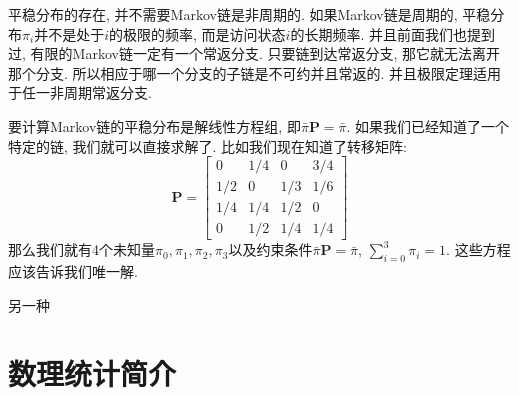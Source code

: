 \begin{remark}
    平稳分布的存在, 并不需要Markov链是非周期的. 如果Markov链是周期的, 平稳分布$\pi_i$并不是处于$i$的极限的频率, 而是访问状态$i$的长期频率. 并且前面我们也提到过, 有限的Markov链一定有一个常返分支. 只要链到达常返分支, 那它就无法离开那个分支. 所以相应于哪一个分支的子链是不可约并且常返的. 并且极限定理适用于任一非周期常返分支. 
\end{remark}

要计算Markov链的平稳分布是解线性方程组, 即$\bar{\pi} \mathbf{P}=\bar{\pi}$. 如果我们已经知道了一个特定的链, 我们就可以直接求解了. 比如我们现在知道了转移矩阵: 
$$
\mathbf{P}=\left[\begin{array}{cccc}
0 & 1 / 4 & 0 & 3 / 4 \\
1 / 2 & 0 & 1 / 3 & 1 / 6 \\
1 / 4 & 1 / 4 & 1 / 2 & 0 \\
0 & 1 / 2 & 1 / 4 & 1 / 4
\end{array}\right]
$$
那么我们就有4个未知量$\pi_0, \pi_1, \pi_2, \pi_3$以及约束条件$\bar{\pi} \mathbf{P}=\bar{\pi}$, $\sum_{i=0}^3 \pi_i=1$. 这些方程应该告诉我们唯一解. 

另一种

\part{数理统计简介}










